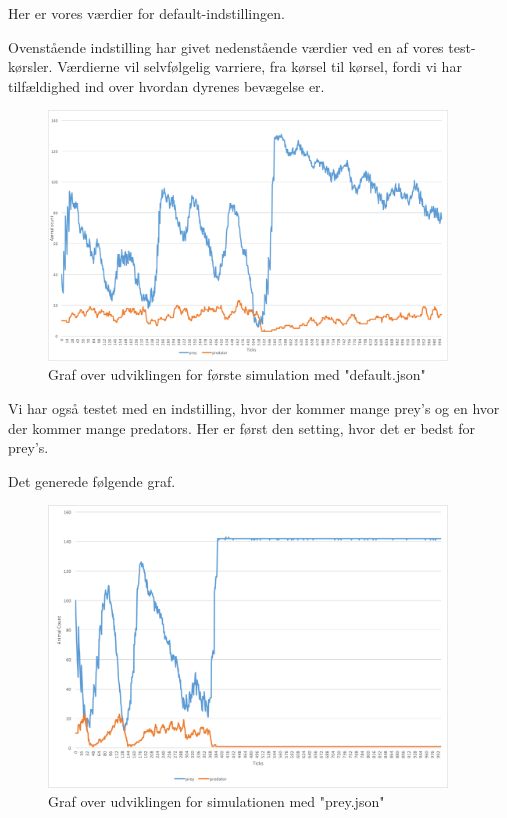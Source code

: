 \documentclass[a4paper]{article}
\begin{document}
    Her er vores værdier for default-indstillingen.
    

    Ovenstående indstilling har givet nedenstående værdier ved en af vores test-kørsler.
    Værdierne vil selvfølgelig varriere, fra kørsel til kørsel, fordi vi har tilfældighed ind over hvordan dyrenes bevægelse er.

    \begin{figure}[H]
      \centering
      \includegraphics[width=400px]{figures/1sim.png}
      \caption{Graf over udviklingen for første simulation med "default.json"}
      \label{fig:firstSimulation}
    \end{figure}

    Vi har også testet med en indstilling, hvor der kommer mange prey's og en hvor der kommer mange predators.
    Her er først den setting, hvor det er bedst for prey's.
    

    Det generede følgende graf.
    \begin{figure}[H]
      \centering
      \includegraphics[width=400px]{figures/2sim.png}
      \caption{Graf over udviklingen for simulationen med "prey.json"}
      \label{fig:secondSimulation}
    \end{figure}
\end{document}
